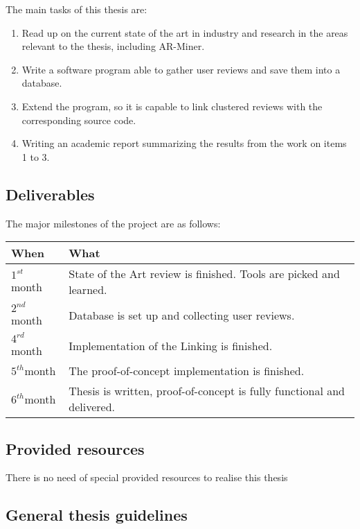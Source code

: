 \documentclass{task_description}
\begin{document}
The main tasks of this thesis are:

\begin{enumerate}
\item Read up on the current state of the art in industry and research in the areas relevant to the thesis, including AR-Miner. %
\item Write a software program able to gather user reviews and save them into a database.
\item Extend the program, so it is capable to link clustered reviews with the corresponding source code.
\item Writing an academic report summarizing the results from the work on items 1 to 3.
\end{enumerate}


\subsection*{Deliverables}
%


The major milestones of the project are as follows:

\begin{tabular}{lp{10cm}}
When & What \\
\hline\noalign{\smallskip}
$1^{\mathit{st}}$ month & State of the Art review is finished. Tools are picked and learned. \\
$2^{\mathit{nd}}$ month & Database is set up and collecting user reviews. \\
$4^{\mathit{rd}}$ month &  Implementation of the Linking is finished. \\
$5^{\mathit{th}}$month & The proof-of-concept implementation is finished.\\
$6^{\mathit{th}}$month & Thesis is written, proof-of-concept is fully functional and delivered.
\end{tabular}

\newpage

\subsection*{Provided resources}

There is no need of special provided resources to realise this thesis

\subsection*{General thesis guidelines}
\end{document}
